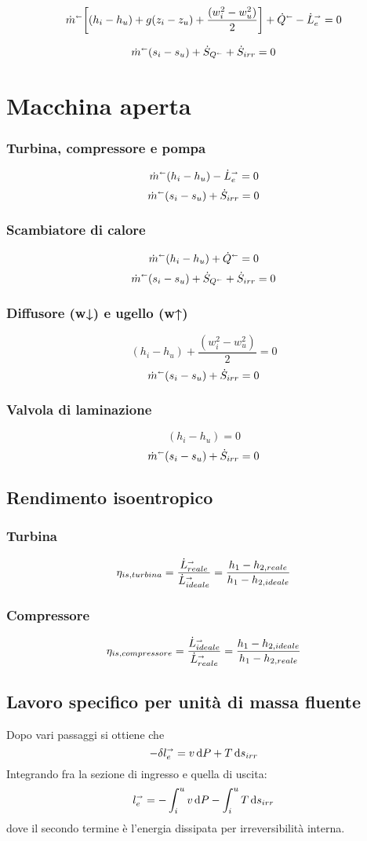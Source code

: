 \[ \dot{m}^\shortleftarrow\qty[(h_i - h_u) + g(z_i-z_u) + \frac{(w_i^2-w_u^2)}{2}] + \dot{Q}^\shortleftarrow - \dot{L}_e^\shortrightarrow = 0 \]

\[ \dot{m}^\shortleftarrow (s_i - s_u) + \dot{S}_{Q^\shortleftarrow} + \dot{S}_{irr} = 0 \]

\section{Macchina aperta}
\subsubsection{Turbina, compressore e pompa}
\[ \dot{m}^\shortleftarrow (h_i - h_u) - \dot{L}_e^\shortrightarrow = 0 \]
\[ \dot{m}^\shortleftarrow (s_i - s_u) + \dot{S}_{irr} = 0 \]

\subsubsection{Scambiatore di calore}
\[ \dot{m}^\shortleftarrow (h_i - h_u) + \dot{Q}^\shortleftarrow = 0 \]
\[ \dot{m}^\shortleftarrow (s_i - s_u) + \dot{S}_{Q^\shortleftarrow} + \dot{S}_{irr} = 0 \]

\subsubsection{Diffusore (w↓) e ugello (w↑)}
\[  (h_i - h_u) + \frac{(w_i^2 - w_u^2)}{2} = 0 \]
\[ \dot{m}^\shortleftarrow (s_i - s_u) + \dot{S}_{irr} = 0 \]

\subsubsection{Valvola di laminazione}
\[  (h_i - h_u) = 0 \]
\[ \dot{m}^\shortleftarrow (s_i - s_u) + \dot{S}_{irr} = 0 \]

\subsection{Rendimento isoentropico}
\subsubsection{Turbina}
\[ \eta_{is,turbina} = \frac{\dot{L}_{reale}^\shortrightarrow}{\dot{L}_{ideale}^\shortrightarrow} = \frac{h_1 - h_{2,reale}}{h_1 - h_{2,ideale}} \]

\subsubsection{Compressore}
\[ \eta_{is,compressore} = \frac{\dot{L}_{ideale}^\shortrightarrow}{\dot{L}_{reale}^\shortrightarrow} = \frac{h_1 - h_{2,ideale}}{h_1 - h_{2,reale}} \]

\subsection{Lavoro specifico per unità di massa fluente}
Dopo vari passaggi si ottiene che
\[ -\delta l_e^\shortrightarrow = v\dd{P} + T\dd{s_{irr}} \]
Integrando fra la sezione di ingresso e quella di uscita:
\[ l_e^\shortrightarrow = -\int_i^u v\dd{P} -\int_i^u T\dd{s_{irr}} \]
dove il secondo termine è l'energia dissipata per irreversibilità interna.
